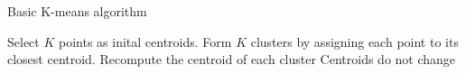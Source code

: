 \begin{algorithm}
	\caption{Basic K-means algorithm}\label{alg:kmeans}
	\begin{algorithmic}[1]
			\State Select $K$ points as inital centroids.
			\Repeat
				\State Form $K$ clusters by assigning each point to its closest centroid.
				\State Recompute the centroid of each cluster
			\Until Centroids do not change
	\end{algorithmic}
\end{algorithm}
